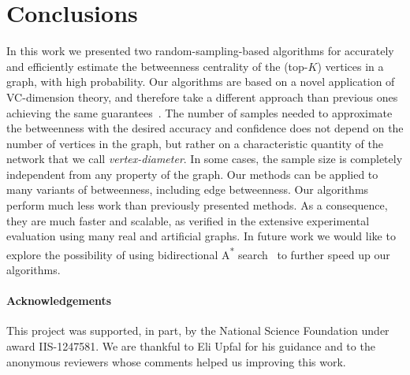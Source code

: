 \section{Conclusions}\label{sec:concl}
In this work we presented two random-sampling-based algorithms for accurately and
efficiently estimate the betweenness centrality of the (top-$K$) vertices in a
graph, with high probability.
Our algorithms are based on a novel application of VC-dimension theory, and
therefore take a different approach than previous ones achieving the same
guarantees~\citep{BrandesP07,GeisbergerSS08,JacobKLPT05}. The number of samples
needed to approximate the betweenness with the desired accuracy and confidence
does not depend on the number of vertices in the graph, but rather on a
characteristic quantity of the network that we call
\emph{vertex-diameter}. In some cases, the sample size is completely
independent from any property of the graph. %
\ifproof
Our methods can be applied to many variants of betweenness, including edge
betweenness. %
\fi
Our algorithms perform much less work than previously presented methods. %
As a consequence, they are much faster and
scalable, as verified in the extensive experimental
evaluation using many real and artificial graphs. In future work we would like
to explore the possibility of using bidirectional A\textsuperscript{*}
search~\citep{Pohl69,KaindlK97} to further speed up our algorithms.  

\ifdmkd
\else
\paragraph*{Acknowledgements} This project was supported, in part, by the
National Science Foundation under award IIS-1247581. We are thankful to Eli
Upfal for his guidance and to the anonymous reviewers whose comments helped us
improving this work.
\fi

